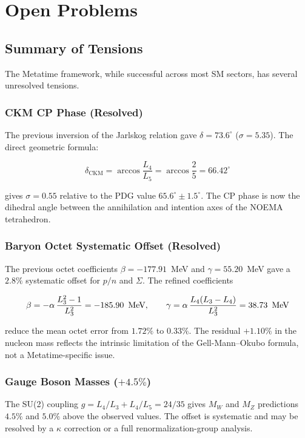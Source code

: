 \chapter{Open Problems}
\label{ch:open_problems}

\section{Summary of Tensions}

The Metatime framework, while successful across most SM sectors, has
several unresolved tensions.

\subsection{CKM CP Phase (Resolved)}

The previous inversion of the Jarlskog relation gave
\(\delta = 73.6^\circ\) (\(\sigma = 5.35\)).  The direct geometric
formula:

\[
\delta_{\text{CKM}} = \arccos\frac{L_4}{L_5}
                    = \arccos\frac{2}{5}
                    = 66.42^\circ
\]

gives \(\sigma = 0.55\) relative to the PDG value
\(65.6^\circ \pm 1.5^\circ\).  The CP phase is now the dihedral angle
between the annihilation and intention axes of the NOEMA tetrahedron.

\subsection{Baryon Octet Systematic Offset (Resolved)}

The previous octet coefficients \(\beta = -177.91\)~MeV and
\(\gamma = 55.20\)~MeV gave a \(2.8\%\) systematic offset for \(p/n\)
and \(\Sigma\).  The refined coefficients

\[
\beta = -\alpha\,\frac{L_3^2-1}{L_3^2} = -185.90\ \,\text{MeV},\qquad
\gamma = \alpha\,\frac{L_4(L_3-L_4)}{L_3^2} = 38.73\ \,\text{MeV}
\]

reduce the mean octet error from \(1.72\%\) to \(0.33\%\).  The
residual \(+1.10\%\) in the nucleon mass reflects the intrinsic
limitation of the Gell-Mann--Okubo formula, not a Metatime-specific
issue.

\subsection{Gauge Boson Masses (\(+4.5\%\))}

The SU(2) coupling \(g = L_4/L_3 + L_4/L_5 = 24/35\) gives \(M_W\) and
\(M_Z\) predictions \(4.5\%\) and \(5.0\%\) above the observed values.
The offset is systematic and may be resolved by a \(\kappa\) correction
or a full renormalization-group analysis.

